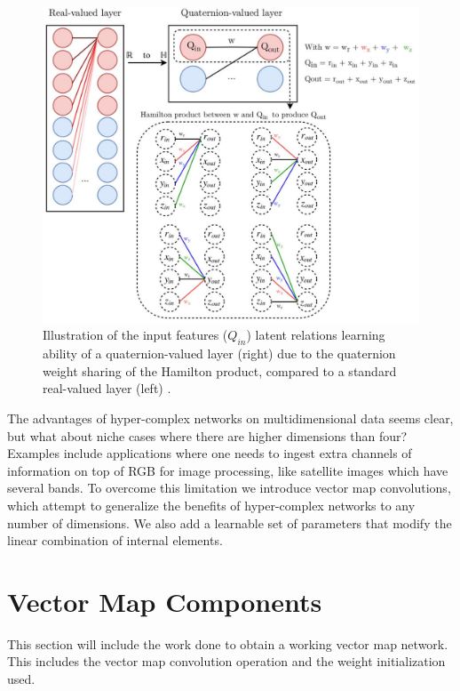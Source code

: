 \documentclass[14pt,a4paper]{article}
\begin{document}
\begin{figure}
	\centering
		\includegraphics[width=1.0\columnwidth]{figures/real-to-quaternion.jpg}
		\caption{Illustration of the input features ($Q_{in}$) latent relations learning ability of a quaternion-valued layer (right) due to the quaternion weight sharing of the Hamilton product, compared to a standard real-valued layer (left) \cite{parcollet2018quaternion-A}.}
	\label{f:hamilton}
\end{figure}

The advantages of hyper-complex networks on multidimensional data seems clear, but what about niche cases where there are higher dimensions than four?
Examples include applications where one needs to ingest extra channels of information on top of RGB for image processing, like satellite images which have several bands.
To overcome this limitation we introduce vector map convolutions, which attempt to generalize the benefits of hyper-complex networks to any number of dimensions.
We also add a learnable set of parameters that modify the linear combination of internal elements.


\section{Vector Map Components}
This section will include the work done to obtain a working vector map network.
This includes the vector map convolution operation and the weight initialization used.
\end{document}
